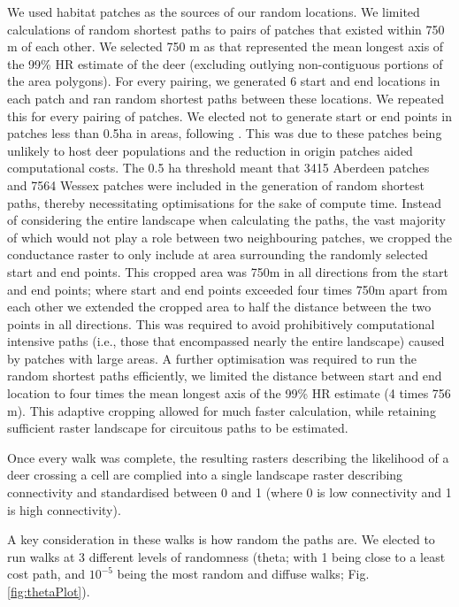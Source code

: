 \documentclass[10pt,a4paper]{article}
\begin{document}
We used habitat patches as the sources of our random locations.
We limited calculations of random shortest paths to pairs of patches that existed within 750 m of each other.
We selected 750 m as that represented the mean longest axis of the 99\% HR estimate of the deer (excluding outlying non-contiguous portions of the area polygons).
For every pairing, we generated 6 start and end locations in each patch and ran random shortest paths between these locations.
We repeated this for every pairing of patches.
We elected not to generate start or end points in patches less than 0.5ha in areas, following .
This was due to these patches being unlikely to host deer populations and the reduction in origin patches aided computational costs.
The 0.5 ha threshold meant that 3415 Aberdeen patches and 7564 Wessex patches were included in the generation of random shortest paths, thereby necessitating optimisations for the sake of compute time.
Instead of considering the entire landscape when calculating the paths, the vast majority of which would not play a role between two neighbouring patches, we cropped the conductance raster to only include at area surrounding the randomly selected start and end points.
This cropped area was 750m in all directions from the start and end points; where start and end points exceeded four times 750m apart from each other we extended the cropped area to half the distance between the two points in all directions.
This was required to avoid prohibitively computational intensive paths (i.e., those that encompassed nearly the entire landscape) caused by patches with large areas.
A further optimisation was required to run the random shortest paths efficiently, we limited the distance between start and end location to four times the mean longest axis of the 99\% HR estimate (4 times 756 m).
This adaptive cropping allowed for much faster calculation, while retaining sufficient raster landscape for circuitous paths to be estimated.

Once every walk was complete, the resulting rasters describing the likelihood of a deer crossing a cell are complied into a single landscape raster describing connectivity and standardised between 0 and 1 (where 0 is low connectivity and 1 is high connectivity).

A key consideration in these walks is how random the paths are.
We elected to run walks at 3 different levels of randomness (theta; with 1 being close to a least cost path, and \ensuremath{10^{-5}} being the most random and diffuse walks; Fig. \ref{fig:thetaPlot}).
\end{document}
